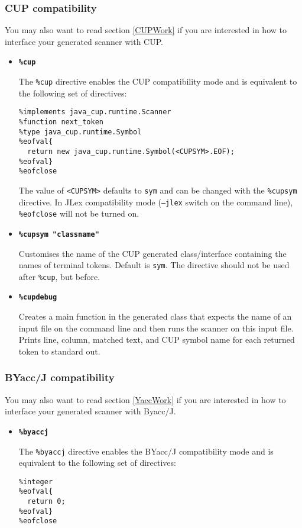 \documentclass[11pt]{scrartcl}
\begin{document}
\subsubsection{CUP compatibility\label{CupMode}}
You may also want to read section \ref{CUPWork} 
if you are interested in how to interface your generated
scanner with CUP.
\begin{itemize}
\item
{\bf \texttt{\%cup}}

The \texttt{\%cup} directive enables the CUP compatibility mode and is equivalent
to the following set of directives:

\begin{verbatim}
%implements java_cup.runtime.Scanner
%function next_token
%type java_cup.runtime.Symbol
%eofval{
  return new java_cup.runtime.Symbol(<CUPSYM>.EOF);
%eofval}
%eofclose
\end{verbatim}

The value of \texttt{<CUPSYM>} defaults to \texttt{sym} and can be
changed with the \texttt{\%cupsym} directive. In JLex compatibility
mode (\texttt{--jlex} switch on the command line), \texttt{\%eofclose}
will not be turned on.

\item
{\bf \texttt{\%cupsym "classname"}}

Customises the name of the CUP generated class/interface 
containing the names of terminal tokens. Default is \texttt{sym}.
The directive should not be used after \texttt{\%cup}, but before.

\item
{\bf \texttt{\%cupdebug}}

Creates a main function in the generated class that expects the name
of an input file on the command line and then runs the scanner on this
input file. Prints line, column, matched text, and CUP symbol name for
each returned token to standard out.

\end{itemize}

\subsubsection{BYacc/J compatibility\label{YaccMode}}
You may also want to read section \ref{YaccWork} 
if you are interested in how to interface your generated
scanner with Byacc/J.
\begin{itemize}
\item
{\bf \texttt{\%byaccj}}

The \texttt{\%byaccj} directive enables the BYacc/J compatibility mode and is equivalent
to the following set of directives:

\begin{verbatim}
%integer
%eofval{
  return 0;
%eofval}
%eofclose
\end{verbatim}

\end{itemize}
\end{document}
